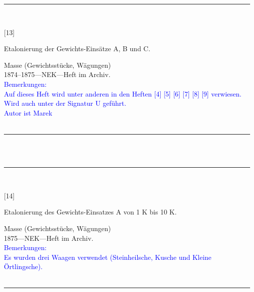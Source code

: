 \parbox{\textwidth}{%
\rule{\textwidth}{1pt}\vspace*{-3mm}\\
\begin{minipage}[t]{0.15\textwidth}\vspace{0pt}
\Huge\rule[-4mm]{0cm}{1cm}[13]
\end{minipage}
\hfill
\begin{minipage}[t]{0.85\textwidth}\vspace{0pt}
\large Etalonierung der Gewichts-Einsätze A, B und C.\rule[-2mm]{0mm}{2mm}
\end{minipage}
{\footnotesize\flushright
Masse (Gewichtsstücke, Wägungen)\\
}
1874--1875\quad---\quad NEK\quad---\quad Heft im Archiv.\\
\textcolor{blue}{Bemerkungen:\\{}
Auf dieses Heft wird unter anderen in den Heften [4] [5] [6] [7] [8] [9] verwiesen.\\{}
Wird auch unter der Signatur U geführt.\\{}
Autor ist Marek\\{}
}
\\[-15pt]
\rule{\textwidth}{1pt}
}
\\
\vspace*{-2.5pt}\\
\parbox{\textwidth}{%
\rule{\textwidth}{1pt}\vspace*{-3mm}\\
\begin{minipage}[t]{0.15\textwidth}\vspace{0pt}
\Huge\rule[-4mm]{0cm}{1cm}[14]
\end{minipage}
\hfill
\begin{minipage}[t]{0.85\textwidth}\vspace{0pt}
\large Etalonierung des Gewichts-Einsatzes {\glqq}A{\grqq} von 1 K bis 10 K.\rule[-2mm]{0mm}{2mm}
\end{minipage}
{\footnotesize\flushright
Masse (Gewichtsstücke, Wägungen)\\
}
1875\quad---\quad NEK\quad---\quad Heft im Archiv.\\
\textcolor{blue}{Bemerkungen:\\{}
Es wurden drei Waagen verwendet (Steinheilsche, Kusche und Kleine Örtlingsche).\\{}
}
\\[-15pt]
\rule{\textwidth}{1pt}
}
\\
